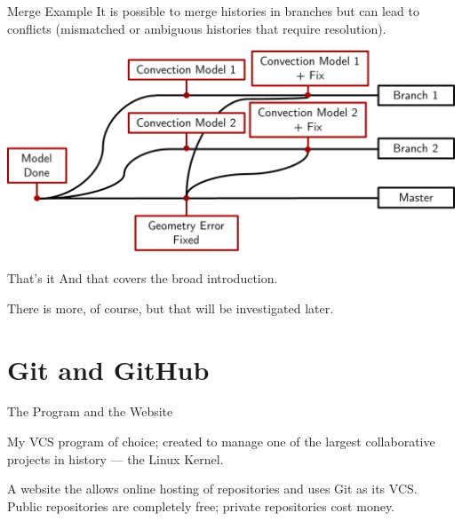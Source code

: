 \documentclass[10pt,t,xcolor=table]{UWMadBeamer}
\begin{document}
    \begin{frame}[c]{Merge Example}
        It is possible to {merge} histories in branches but can lead to { conflicts} (mismatched or ambiguous histories that require resolution).
        
        {
            \centering
            \includegraphics[scale=0.50]{MergeExample}
        }
    \end{frame}

    \begin{frame}{That's it}
        And that covers the broad introduction.
        
        There is more, of course, but that will be investigated later.
    \end{frame}



\section{Git and GitHub}
    \begin{frame}{The Program and the Website}
        \begin{description}
            \setlength{\itemsep}{0.65em}
            \item[{\usebeamercolor[fg]{frametitle} Git}]
                {My VCS program of choice; created to manage one of the largest collaborative projects in history --- the Linux Kernel.}
            \item[{\usebeamercolor[fg]{frametitle} GitHub}]
                {A website the allows online hosting of repositories and uses Git as its VCS.  Public repositories are completely free; private repositories cost money.}
        \end{description}
    \end{frame}
\end{document}
